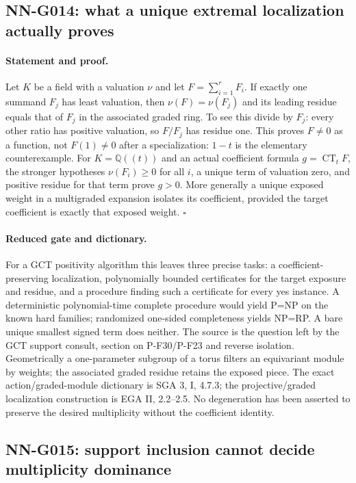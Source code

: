 \subsection{NN-G014: what a unique extremal localization actually proves}
\paragraph{Statement and proof.}
Let $K$ be a field with a valuation $\nu$ and let
$F=\sum_{i=1}^rF_i$. If exactly one summand $F_j$ has
least valuation, then
$\nu(F)=\nu(F_j)$ and its leading residue equals that of
$F_j$ in the associated graded ring. To see this divide
by $F_j$: every other ratio has positive valuation, so
$F/F_j$ has residue one. This proves $F\ne0$ as a
function, not $F(1)\ne0$ after a specialization: $1-t$
is the elementary counterexample.
For $K=\mathbb Q((t))$ and an actual coefficient formula
$g=\operatorname{CT}_tF$,
the stronger hypotheses $\nu(F_i)\ge0$ for all $i$, a unique
term of valuation zero, and positive residue for that term
prove $g>0$. More generally a unique exposed weight in a
multigraded expansion isolates its coefficient, provided
the target coefficient is exactly that exposed weight.
\hfill$\square$

\paragraph{Reduced gate and dictionary.}
For a GCT positivity algorithm this leaves three precise
tasks: a coefficient-preserving localization, polynomially
bounded certificates for the target exposure and residue,
and a procedure finding such a certificate for every yes
instance. A deterministic polynomial-time complete procedure
would yield P=NP on the known hard families; randomized
one-sided completeness yields NP=RP. A bare unique smallest
signed term does neither. The source is the question left
by the GCT support consult, section on P-F30/P-F23 and
reverse isolation. Geometrically a one-parameter subgroup
of a torus filters an equivariant module by weights; the
associated graded residue retains the exposed piece. The
exact action/graded-module dictionary is SGA 3, I, 4.7.3;
the projective/graded localization construction is EGA II,
2.2--2.5. No degeneration has been asserted to preserve
the desired multiplicity without the coefficient identity.

\subsection{NN-G015: support inclusion cannot decide multiplicity dominance}
